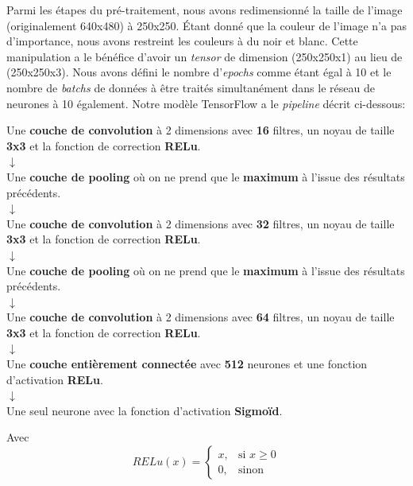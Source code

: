 \documentclass[french]{article}
\theoremstyle{mytheoremstyle}
\theoremstyle{mytheoremstyle}
\theoremstyle{myproblemstyle}
\begin{document}
       Parmi les étapes du pré-traitement, nous avons redimensionné la taille de l'image (originalement 640x480) à 250x250. Étant donné que la couleur de l'image n'a pas d'importance, nous avons restreint les couleurs à du noir et blanc. Cette manipulation a le bénéfice d'avoir un \emph{tensor} de dimension (250x250x1) au lieu de (250x250x3). Nous avons défini le nombre d'\emph{epochs} comme étant égal à 10 et le nombre de \emph{batchs} de données à être traités simultanément dans le réseau de neurones à 10 également. Notre modèle TensorFlow a le \emph{pipeline} décrit ci-dessous:
        \begin{center}
            Une \textbf{couche de convolution} à 2 dimensions avec \textbf{16} filtres, un noyau de taille \textbf{3x3} et la fonction de correction \textbf{RELu}. \\
            $
            \downarrow
            $\\
            Une \textbf{couche de pooling} où on ne prend que le \textbf{maximum} à l'issue des résultats précédents. \\
            $
            \downarrow
            $\\
            Une \textbf{couche de convolution} à 2 dimensions avec \textbf{32} filtres, un noyau de taille \textbf{3x3} et la fonction de correction \textbf{RELu}. \\
            $
            \downarrow
            $\\
            Une \textbf{couche de pooling} où on ne prend que le \textbf{maximum} à l'issue des résultats précédents. \\
            $
            \downarrow
            $\\
            Une \textbf{couche de convolution} à 2 dimensions avec \textbf{64} filtres, un noyau de taille \textbf{3x3} et la fonction de correction \textbf{RELu}.\\
            $
            \downarrow
            $\\
            Une \textbf{couche entièrement connectée} avec \textbf{512} neurones et une fonction d'activation \textbf{RELu}.\\
            $
            \downarrow
            $\\
            Une seul neurone avec la fonction d'activation \textbf{Sigmoïd}.
        \end{center}
        Avec 
        \[
        RELu(x) = \begin{cases}
            x,& \text{si } x \ge 0\\
            0,& \text{sinon}
        \end{cases}
        \]
\end{document}
